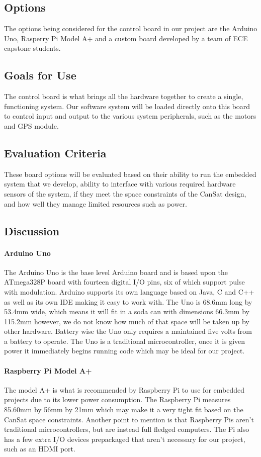 \documentclass[10pt,letterpaper,onecolumn,journal]{IEEEtran}
\begin{document}
\subsection{Options}
The options being considered for the control board in our project are the Arduino Uno, Rasperry Pi Model A+ and a custom board developed by a team of ECE capstone students.
\subsection{Goals for Use}
The control board is what brings all the hardware together to create a single, functioning system. Our software system will be loaded directly onto this board to control input and output to the various system peripherals, such as the motors and GPS module.
\subsection{Evaluation Criteria}
These board options will be evaluated based on their ability to run the embedded system that we develop, ability to interface with various required hardware sensors of the system, if they meet the space constraints of the CanSat design, and how well they manage limited resources such as power.
\subsection{Discussion}
\paragraph{Arduino Uno}
The Arduino Uno is the base level Arduino board and is based upon the ATmega328P board with fourteen digital I/O pins, six of which support pulse with modulation\cite{Arduino}. Arduino supports its own language based on Java, C and C++ as well as its own IDE making it easy to work with. The Uno is 68.6mm long by 53.4mm wide, which means it will fit in a soda can with dimensions 66.3mm by 115.2mm however, we do not know how much of that space will be taken up by other hardware. Battery wise the Uno only requires a maintained five volts from a battery to operate. The Uno is a traditional microcontroller, once it is given power it immediately begins running code which may be ideal for our project.
\paragraph{Raspberry Pi Model A+}
The model A+ is what is recommended by Raspberry Pi to use for embedded projects due to its lower power consumption. The Raspberry Pi measures 85.60mm by 56mm by 21mm which may make it a very tight fit based on the CanSat space constraints\cite{PI}. Another point to mention is that Raspberry Pis aren't traditional microcontrollers, but are instead full fledged computers. The Pi also has a few extra I/O devices prepackaged that aren't necessary for our project, such as an HDMI port.
\end{document}
